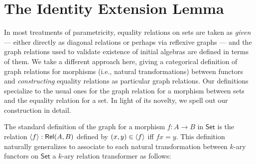 \documentclass[runningheads]{llncs}
\newcommand{\set}{\mathsf{Set}}
\begin{document}
\begin{comment}
    \rho[\psi := \text{--}][\overline{\beta := \text{--}}])
    (\overline{\setsem{\Gamma;\Phi \vdash \tau[\phi := H]}\rho}) \\
=&\mu(\setsem{\Gamma; \Phi, \psi, \overline{\beta}, \phi \vdash G}
\rho [\phi := \setsem{\Gamma;\Phi,\overline{\alpha}\vdash
    H}\rho[\overline{\alpha := \text{--}}]][\psi := \text{--}]
     [\overline{\beta := \text{--}}]) \\
&\hspace{0.5in} (\overline{\setsem{\Gamma;\Phi,\phi \vdash \tau} \rho
       [\phi := \setsem{\Gamma;\Phi,\overline{\alpha}\vdash H}
         \rho[\overline{\alpha := \text{--}}]]}) \\
=&\setsem{\Gamma;\Phi,\phi\vdash(\mu\psi.\lambda\overline{\beta}.G)
  \overline{\tau}}\rho [\phi :=
  \setsem{\Gamma;\Phi,\overline{\alpha}\vdash H}\rho[\overline{\alpha
      := \text{--}}]] 
\end{array}\]
Here, the first equality is by
Definition~\ref{def:second-order-subst}, the second and fourth are by
Definition~\ref{def:set-sem}, and the third is by the induction
hypothesis and weakening.
\end{itemize}
\end{proof}
\end{comment}

\section{The Identity Extension Lemma}\label{sec:iel}

In most treatments of parametricity, equality relations on sets are
taken as {\em given} --- either directly as diagonal relations or
perhaps via reflexive graphs --- and
the graph relations used to validate existence of initial algebras are
defined in terms of them. We take a different approach here, giving a
categorical definition of graph relations for morphisms (i.e., natural
transformations) between functors and {\em constructing} equality
relations as particular graph relations. Our definitions specialize to
the usual ones for the graph relation for a morphism between sets and
the equality relation for a set. In light of its novelty, we spell out
our construction in detail.

The standard definition of the graph for a morphism $f : A \to B$ in
$\set$ is the relation $\langle {f} \rangle : \mathsf{Rel}(A,B)$ defined by $(x,y) \in
\langle {f} \rangle$ iff $fx = y$. This definition naturally generalizes to
associate to each natural transformation between $k$-ary functors on
$\set$ a $k$-ary relation transformer as follows:
\end{document}
